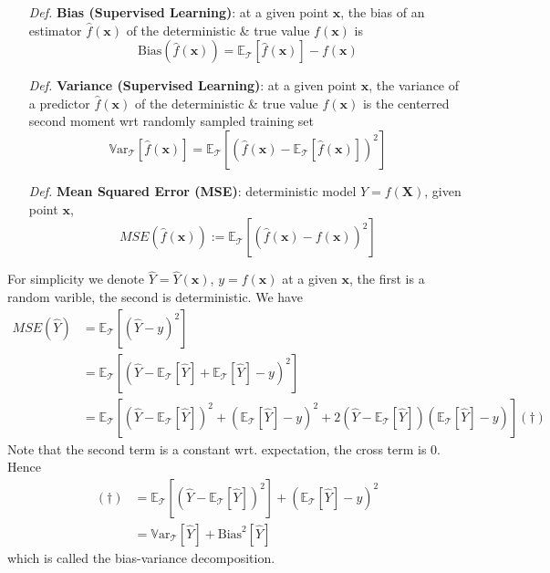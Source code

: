 \documentclass[a4paper, 11pt]{article}
\begin{document}
\begin{itemize}
	\item[\textit{Def.}] \textbf{Bias (Supervised Learning)}: at a given point $\bm{x}$, the bias of an estimator $\hat{f}(\bm{x})$ of the deterministic \& true value $f(\bm{x})$ is
	$$
	\text{Bias}(\hat{f}(\bm{x}))=\mathbb{E}_{\mathcal{T}}\left[\hat{f}(\bm{x})\right] - f(\bm{x})
	$$

	\item[\textit{Def.}] \textbf{Variance (Supervised Learning)}: at a given point $\bm{x}$, the variance of a predictor $\hat{f}(\bm{x})$ of the  deterministic \& true value $f(\bm{x})$ is the centerred second moment wrt randomly sampled training set
	$$
	\mathrm{\mathbb{V}ar}_{\mathcal{T}}\left[\hat{f}(\bm{x})\right] = \mathbb{E}_{\mathcal{T}}\left[\left(\hat{f}(\bm{x})-\mathbb{E}_{\mathcal{T}}\left[\hat{f}(\bm{x})\right]\right)^2\right]
	$$

	\item[\textit{Def.}] \textbf{Mean Squared Error (MSE)}: deterministic model $Y = f(\bm{X})$, given point $\bm{x}$,
	$$
	MSE(\hat{f}(\bm{x})) := \mathbb{E}_{\mathcal{T}}\left[\left(\hat{f}(\bm{x}) - f(\bm{x})\right)^2\right]
	$$
\end{itemize}
For simplicity we denote $\hat{Y}=\hat{Y}(\bm{x})$, $y=f(\bm{x})$ at a given $\bm{x}$, the first is a random varible, the second is deterministic. We have
\begin{equation}
	\begin{split}
		MSE(\hat{Y}) &= \mathbb{E}_{\mathcal{T}}\left[\left(\hat{Y} - y\right)^2\right] \\
		& = \mathbb{E}_{\mathcal{T}}\left[\left(\hat{Y} - \mathbb{E}_{\mathcal{T}}[\hat{Y}] + \mathbb{E}_{\mathcal{T}}[\hat{Y}] - y\right)^2\right] \\
		& = \mathbb{E}_{\mathcal{T}}\left[\left(\hat{Y} - \mathbb{E}_{\mathcal{T}}[\hat{Y}]\right)^2 + \left(\mathbb{E}_{\mathcal{T}}[\hat{Y}] - y\right)^2 + 2(\hat{Y} - \mathbb{E}_{\mathcal{T}}[\hat{Y}])(\mathbb{E}_{\mathcal{T}}[\hat{Y}] - y)\right] (\dag)
	\end{split}
\end{equation}
Note that the second term is a constant wrt. expectation, the cross term is 0. Hence 
\begin{equation}
	\begin{split}
		(\dag) &= \mathbb{E}_{\mathcal{T}}\left[\left(\hat{Y} - \mathbb{E}_{\mathcal{T}}[\hat{Y}]\right)^2\right] + \left(\mathbb{E}_{\mathcal{T}}[\hat{Y}] - y\right)^2 \\
		&= \mathrm{\mathbb{V}ar}_{\mathcal{T}}[\hat{Y}] + \text{Bias}^2[\hat{Y}]
	\end{split}
\end{equation}
which is called the bias-variance decomposition.
\end{document}
